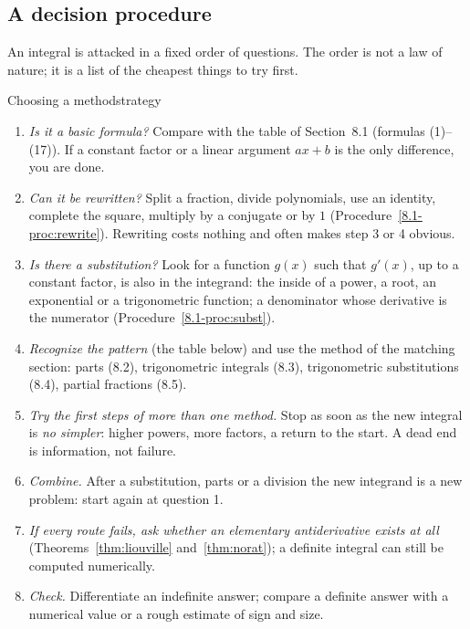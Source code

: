 \documentclass[11pt]{article}
\begin{document}
\subsection*{A decision procedure}

An integral is attacked in a fixed order of questions. The order is not a law of nature; it is a list of the cheapest things to try first.

\begin{proc}{Choosing a method}{strategy}
\begin{enumerate}[nosep]
  \item \emph{Is it a basic formula?} Compare with the table of Section~8.1 (formulas (1)--(17)). If a constant factor or a linear argument $ax+b$ is the only difference, you are done.
  \item \emph{Can it be rewritten?} Split a fraction, divide polynomials, use an identity, complete the square, multiply by a conjugate or by $1$ (Procedure~\ref{8.1-proc:rewrite}). Rewriting costs nothing and often makes step 3 or 4 obvious.
  \item \emph{Is there a substitution?} Look for a function $g(x)$ such that $g'(x)$, up to a constant factor, is also in the integrand: the inside of a power, a root, an exponential or a trigonometric function; a denominator whose derivative is the numerator (Procedure~\ref{8.1-proc:subst}).
  \item \emph{Recognize the pattern} (the table below) and use the method of the matching section: parts (8.2), trigonometric integrals (8.3), trigonometric substitutions (8.4), partial fractions (8.5).
  \item \emph{Try the first steps of more than one method.} Stop as soon as the new integral is \emph{no simpler}: higher powers, more factors, a return to the start. A dead end is information, not failure.
  \item \emph{Combine.} After a substitution, parts or a division the new integrand is a new problem: start again at question 1.
  \item \emph{If every route fails, ask whether an elementary antiderivative exists at all} (Theorems~\ref{thm:liouville} and~\ref{thm:norat}); a definite integral can still be computed numerically.
  \item \emph{Check.} Differentiate an indefinite answer; compare a definite answer with a numerical value or a rough estimate of sign and size.
\end{enumerate}
\end{proc}
\end{document}
